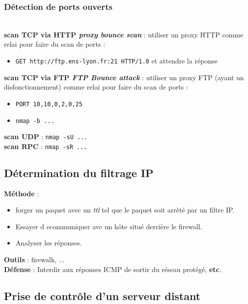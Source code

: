 \documentclass[journal, a4paper]{IEEEtran}
\begin{document}
		\subsubsection{Détection de ports ouverts}
		~\\
			\textbf{scan TCP via HTTP \textit{proxy bounce scan}} : utiliser un proxy HTTP comme relai pour faire du scan de ports :
			\begin{itemize}
				\item \verb$GET http://ftp.ens-lyon.fr:21 HTTP/1.0$ et attendre la réponse
			\end{itemize}
			\textbf{scan TCP via FTP \textit{FTP Bounce attack}} : utiliser un proxy FTP (ayant un disfonctionnement) comme relai pour faire du scan de ports :
			\begin{itemize}
				\item \verb$PORT 10,10,0,2,0,25$
				\item \verb$nmap -b ...$
			\end{itemize}
			\textbf{scan UDP} : \verb$nmap -sU ...$\\
			\textbf{scan RPC} : \verb$nmap -sR ...$
		
	\subsection{Détermination du filtrage IP}
	
		\textbf{Méthode} :
		\begin{itemize}
			\item forger un paquet avec un \textit{ttl} tel que le paquet soit arrêté par un filtre IP.
			\item Essayer d ecommuniquer avc un hôte situé derrière le firewall.
			\item Analyser les réponses.
		\end{itemize}
		\textbf{Outils} : firewalk, ...\\
		\textbf{Défense} : Interdir aux réponses ICMP de sortir du réseau protégé, \textbf{etc}.
	
	\subsection{Prise de contrôle d'un serveur distant}
		
\end{document}
